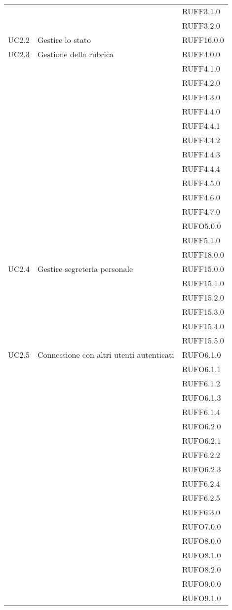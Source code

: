 \begin{center}
\begin{longtable}{lp{}l}
 &  & RUFF3.1.0 \\
 &  & RUFF3.2.0 \\
UC2.2 & Gestire lo stato & RUFF16.0.0 \\
UC2.3 & Gestione della rubrica & RUFF4.0.0 \\
 &  & RUFF4.1.0 \\
 &  & RUFF4.2.0 \\
 &  & RUFF4.3.0 \\
 &  & RUFF4.4.0 \\
 &  & RUFF4.4.1 \\
 &  & RUFF4.4.2 \\
 &  & RUFF4.4.3 \\
 &  & RUFF4.4.4 \\
 &  & RUFF4.5.0 \\
 &  & RUFF4.6.0 \\
 &  & RUFF4.7.0 \\
 &  & RUFO5.0.0 \\
 &  & RUFF5.1.0 \\
 &  & RUFF18.0.0 \\
UC2.4 & Gestire segreteria personale & RUFF15.0.0 \\
 &  & RUFF15.1.0 \\
 &  & RUFF15.2.0 \\
 &  & RUFF15.3.0 \\
 &  & RUFF15.4.0 \\
 &  & RUFF15.5.0 \\
UC2.5 & Connessione con altri utenti autenticati & RUFO6.1.0 \\
 &  & RUFO6.1.1 \\
 &  & RUFF6.1.2 \\
 &  & RUFO6.1.3 \\
 &  & RUFF6.1.4 \\
 &  & RUFO6.2.0 \\
 &  & RUFO6.2.1 \\
 &  & RUFF6.2.2 \\
 &  & RUFO6.2.3 \\
 &  & RUFF6.2.4 \\
 &  & RUFF6.2.5 \\
 &  & RUFF6.3.0 \\
 &  & RUFO7.0.0 \\
 &  & RUFO8.0.0 \\
 &  & RUFO8.1.0 \\
 &  & RUFO8.2.0 \\
 &  & RUFO9.0.0 \\
 &  & RUFO9.1.0 \\

\end{longtable}
\end{center}
